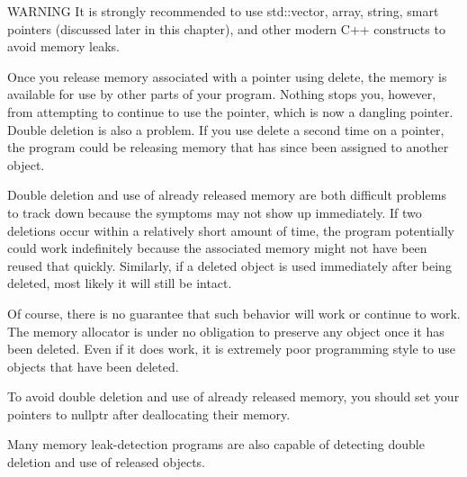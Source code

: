 \begin{myWarning}{WARNING}
It is strongly recommended to use std::vector, array, string, smart pointers (discussed later in this chapter), and other modern C++ constructs to avoid memory leaks.
\end{myWarning}


Once you release memory associated with a pointer using delete, the memory is available for use by other parts of your program. Nothing stops you, however, from attempting to continue to use the pointer, which is now a dangling pointer. Double deletion is also a problem. If you use delete a second time on a pointer, the program could be releasing memory that has since been assigned to another object.

Double deletion and use of already released memory are both difficult problems to track down because the symptoms may not show up immediately. If two deletions occur within a relatively short amount of time, the program potentially could work indefinitely because the associated memory might not have been reused that quickly. Similarly, if a deleted object is used immediately after being deleted, most likely it will still be intact.

Of course, there is no guarantee that such behavior will work or continue to work. The memory allocator is under no obligation to preserve any object once it has been deleted. Even if it does work, it is extremely poor programming style to use objects that have been deleted.

To avoid double deletion and use of already released memory, you should set your pointers to nullptr after deallocating their memory.

Many memory leak-detection programs are also capable of detecting double deletion and use of released objects.












